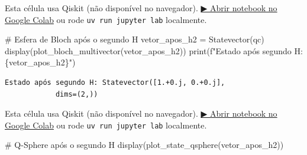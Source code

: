 \documentclass[
  brazilian,
]{report}
\newenvironment{Shaded}{\begin{snugshade}}{\end{snugshade}}
\newcommand{\BuiltInTok}[1]{\textcolor[rgb]{0.00,0.23,0.31}{#1}}
\newcommand{\CommentTok}[1]{\textcolor[rgb]{0.37,0.37,0.37}{#1}}
\newcommand{\NormalTok}[1]{\textcolor[rgb]{0.00,0.23,0.31}{#1}}
\newcommand{\OperatorTok}[1]{\textcolor[rgb]{0.37,0.37,0.37}{#1}}
\newcommand{\SpecialCharTok}[1]{\textcolor[rgb]{0.37,0.37,0.37}{#1}}
\newcommand{\SpecialStringTok}[1]{\textcolor[rgb]{0.13,0.47,0.30}{#1}}
\begin{document}
\begin{tcolorbox}[enhanced jigsaw, arc=.35mm, bottomrule=.15mm, bottomtitle=1mm, breakable, colback=white, colbacktitle=quarto-callout-warning-color!10!white, colframe=quarto-callout-warning-color-frame, coltitle=black, left=2mm, leftrule=.75mm, opacityback=0, opacitybacktitle=0.6, rightrule=.15mm, title=\textcolor{quarto-callout-warning-color}{\faExclamationTriangle}\hspace{0.5em}{⚛️ Célula Qiskit --- execute no Colab ou localmente}, titlerule=0mm, toprule=.15mm, toptitle=1mm]

Esta célula usa Qiskit (não disponível no navegador).
\href{https://colab.research.google.com/github/maxwellamaral/aula-quantum/blob/main/notebooks/04-Hadamard-experiment.ipynb}{▶
Abrir notebook no Google Colab} ou rode \texttt{uv\ run\ jupyter\ lab}
localmente.

\begin{Shaded}
\begin{Highlighting}[]

\CommentTok{\# Esfera de Bloch após o segundo H}
\NormalTok{vetor\_apos\_h2 }\OperatorTok{=}\NormalTok{ Statevector(qc)}
\NormalTok{display(plot\_bloch\_multivector(vetor\_apos\_h2))}
\BuiltInTok{print}\NormalTok{(}\SpecialStringTok{f"Estado após segundo H: }\SpecialCharTok{\{}\NormalTok{vetor\_apos\_h2}\SpecialCharTok{\}}\SpecialStringTok{"}\NormalTok{)}
\end{Highlighting}
\end{Shaded}

\end{tcolorbox}

\begin{verbatim}
Estado após segundo H: Statevector([1.+0.j, 0.+0.j],
            dims=(2,))
\end{verbatim}

\begin{tcolorbox}[enhanced jigsaw, arc=.35mm, bottomrule=.15mm, bottomtitle=1mm, breakable, colback=white, colbacktitle=quarto-callout-warning-color!10!white, colframe=quarto-callout-warning-color-frame, coltitle=black, left=2mm, leftrule=.75mm, opacityback=0, opacitybacktitle=0.6, rightrule=.15mm, title=\textcolor{quarto-callout-warning-color}{\faExclamationTriangle}\hspace{0.5em}{⚛️ Célula Qiskit --- execute no Colab ou localmente}, titlerule=0mm, toprule=.15mm, toptitle=1mm]

Esta célula usa Qiskit (não disponível no navegador).
\href{https://colab.research.google.com/github/maxwellamaral/aula-quantum/blob/main/notebooks/04-Hadamard-experiment.ipynb}{▶
Abrir notebook no Google Colab} ou rode \texttt{uv\ run\ jupyter\ lab}
localmente.

\begin{Shaded}
\begin{Highlighting}[]

\CommentTok{\# Q{-}Sphere após o segundo H}
\NormalTok{display(plot\_state\_qsphere(vetor\_apos\_h2))}
\end{Highlighting}
\end{Shaded}

\end{tcolorbox}
\end{document}
